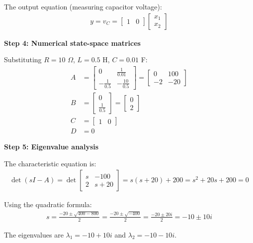 \documentclass[11pt,a4paper]{article}
\begin{document}
The output equation (measuring capacitor voltage):
\begin{align}
  y = v_C = \begin{bmatrix} 1 & 0 \end{bmatrix}\begin{bmatrix} x_1 \\ x_2 \end{bmatrix}
\end{align}

\textbf{Step 4: Numerical state-space matrices}

Substituting $R = 10$ $\Omega$, $L = 0.5$ H, $C = 0.01$ F:
\begin{align}
  A &= \begin{bmatrix} 0 & \frac{1}{0.01} \\ -\frac{1}{0.5} & -\frac{10}{0.5} \end{bmatrix} = \begin{bmatrix} 0 & 100 \\ -2 & -20 \end{bmatrix} \\
  B &= \begin{bmatrix} 0 \\ \frac{1}{0.5} \end{bmatrix} = \begin{bmatrix} 0 \\ 2 \end{bmatrix} \\
  C &= \begin{bmatrix} 1 & 0 \end{bmatrix} \\
  D &= 0
\end{align}

\textbf{Step 5: Eigenvalue analysis}

The characteristic equation is:
\begin{align}
  \det(sI - A) = \det\begin{bmatrix} s & -100 \\ 2 & s+20 \end{bmatrix} = s(s+20) + 200 = s^2 + 20s + 200 = 0
\end{align}

Using the quadratic formula:
\begin{align}
  s = \frac{-20 \pm \sqrt{400 - 800}}{2} = \frac{-20 \pm \sqrt{-400}}{2} = \frac{-20 \pm 20i}{2} = -10 \pm 10i
\end{align}

The eigenvalues are $\lambda_1 = -10 + 10i$ and $\lambda_2 = -10 - 10i$.
\end{document}
